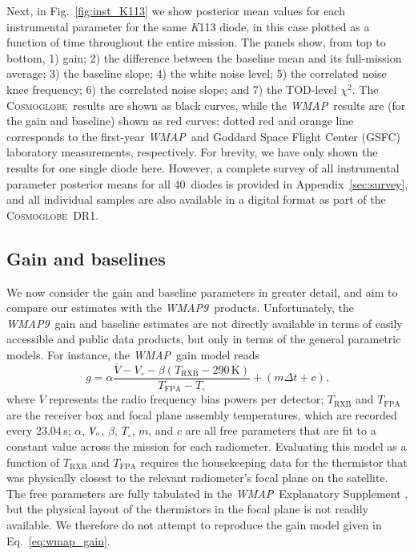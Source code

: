 \documentclass[twocolumn]{../../common/aa}
\def\WMAP{\emph{WMAP}}
\def\WMAPnine{\emph{WMAP9}}
\newcommand{\cosmoglobe}{\textsc{Cosmoglobe}}
\newcommand{\K}[0]{\textit K}
\newcommand{\V}[0]{\textit V}
\begin{document}
Next, in Fig.~\ref{fig:inst_K113} we show posterior mean values for each instrumental parameter for the same \K113 diode, in this case plotted as a function of time throughout the entire mission. The panels show, from top to bottom, 1) gain; 2) the difference between the baseline mean and its full-mission average; 3) the baseline slope; 4) the white noise level; 5) the correlated noise knee frequency; 6) the correlated noise slope; and 7) the TOD-level $\chi^2$. The \cosmoglobe\ results are shown as black curves, while the \WMAP\ results are (for the gain and baseline) shown as red curves; dotted red and orange line corresponds to the first-year \WMAP\ and Goddard Space Flight Center (GSFC) laboratory measurements, respectively. For brevity, we have only shown the results for one single diode here. However, a complete survey of all instrumental parameter posterior means for all 40~diodes is provided in Appendix~\ref{sec:survey}, and all individual samples are also available in a digital format as part of the \cosmoglobe\ DR1. 


\subsection{Gain and baselines}
\label{sec:gain}

We now consider the gain and baseline parameters in greater detail, and aim to compare our estimates with the \WMAPnine\ products. Unfortunately, the \WMAPnine\ gain and baseline estimates are not directly available in terms of easily accessible and public data products, but only in terms of the general parametric models. For instance, the \WMAP\ gain model reads \citet{wmapexsupp}
\begin{equation}
	\label{eq:wmap_gain}
	g=\alpha\frac{\overline V-V_\circ-\beta(T_\mathrm{RXB}-290\,\mathrm K)}
	{T_\mathrm{FPA}-T_\circ}+(m\Delta t+c),
\end{equation}
where $\overline V$ represents the radio frequency bias powers per detector; $T_\mathrm{RXB}$ and $T_\mathrm{FPA}$ are the receiver box and focal plane assembly temperatures, which are recorded every 23.04\,s; $\alpha$, $\V_\circ$, $\beta$, $T_\circ$, $m$, and $c$ are all free parameters that are fit to a constant value across the mission for each radiometer. Evaluating this model as a function of $T_\mathrm{RXB}$ and $T_\mathrm{FPA}$ requires the housekeeping data for the thermistor that was physically closest to the relevant radiometer's focal plane on the satellite. The free parameters are fully tabulated in the \WMAP\ Explanatory Supplement \citep{wmapexsupp}, but the physical layout of the thermistors in the focal plane is not readily available. We therefore do not attempt to reproduce the gain model given in Eq.~\eqref{eq:wmap_gain}.
\end{document}
